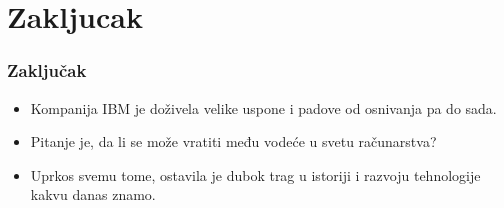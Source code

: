 \documentclass{beamer}
\begin{document}
\section{Zakljucak}

\begin{frame}[fragile]\frametitle{Zaključak}
	\begin{itemize}	
	\item Kompanija IBM je doživela velike uspone i padove od osnivanja pa do sada.
        \item Pitanje je, da li se može vratiti među vodeće u svetu računarstva?
        \item Uprkos svemu tome, ostavila je dubok trag u istoriji i razvoju tehnologije kakvu danas znamo.
	\end{itemize}
\end{frame}
\end{document}
